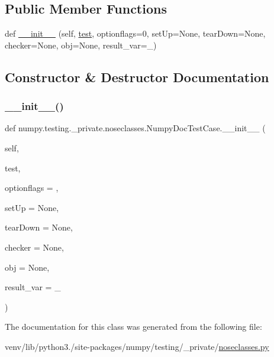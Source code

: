 \subsection*{Public Member Functions}
\begin{DoxyCompactItemize}
\item 
def \hyperlink{classnumpy_1_1testing_1_1__private_1_1noseclasses_1_1NumpyDocTestCase_a731838480d8282a20596862d7068c90a}{\+\_\+\+\_\+init\+\_\+\+\_\+} (self, \hyperlink{namespacenumpy_1_1testing_a6e95cdd7f4d6021fbb8519b9f868c27b}{test}, optionflags=0, set\+Up=None, tear\+Down=None, checker=None, obj=None, result\+\_\+var=\textquotesingle{}\+\_\+\textquotesingle{})
\end{DoxyCompactItemize}


\subsection{Constructor \& Destructor Documentation}
\mbox{\label{classnumpy_1_1testing_1_1__private_1_1noseclasses_1_1NumpyDocTestCase_a731838480d8282a20596862d7068c90a}} 
\subsubsection{\texorpdfstring{\+\_\+\+\_\+init\+\_\+\+\_\+()}{\_\_init\_\_()}}
{\footnotesize\ttfamily def numpy.\+testing.\+\_\+private.\+noseclasses.\+Numpy\+Doc\+Test\+Case.\+\_\+\+\_\+init\+\_\+\+\_\+ (\begin{DoxyParamCaption}\item[{}]{self,  }\item[{}]{test,  }\item[{}]{optionflags = {},  }\item[{}]{set\+Up = {\ttfamily None},  }\item[{}]{tear\+Down = {\ttfamily None},  }\item[{}]{checker = {\ttfamily None},  }\item[{}]{obj = {\ttfamily None},  }\item[{}]{result\+\_\+var = {\ttfamily \textquotesingle{}\+\_\+\textquotesingle{}} }\end{DoxyParamCaption})}



The documentation for this class was generated from the following file\+:\begin{DoxyCompactItemize}
\item 
venv/lib/python3./site-\/packages/numpy/testing/\+\_\+private/\hyperlink{noseclasses_8py}{noseclasses.\+py}\end{DoxyCompactItemize}
